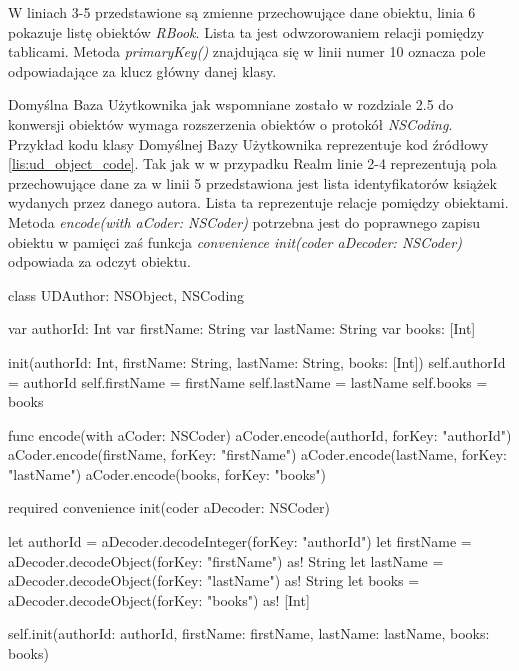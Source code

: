 W liniach 3-5 przedstawione są zmienne przechowujące dane obiektu, linia 6 pokazuje listę obiektów \textit{RBook}. Lista ta jest odwzorowaniem relacji pomiędzy tablicami. Metoda \textit{primaryKey()} znajdująca się w linii numer 10 oznacza pole odpowiadające za klucz główny danej klasy. 

Domyślna Baza Użytkownika jak wspomniane zostało w rozdziale 2.5 do konwersji obiektów wymaga rozszerzenia obiektów o protokół \textit{NSCoding}. Przykład kodu klasy Domyślnej Bazy Użytkownika reprezentuje kod źródłowy \ref{lis:ud_object_code}. Tak jak w w przypadku Realm linie 2-4 reprezentują pola przechowujące dane za w linii 5 przedstawiona jest lista identyfikatorów książek wydanych przez danego autora. Lista ta reprezentuje relacje pomiędzy obiektami. Metoda \textit{encode(with aCoder: NSCoder)} potrzebna jest do poprawnego zapisu obiektu w pamięci zaś funkcja \textit{convenience init(coder aDecoder: NSCoder)} odpowiada za odczyt obiektu.

\begin{code}[
		language=swift,
		caption={Przykład obiektu Domyślnej Bazy Użytkownika},
		label={lis:ud_object_code},
	]
class UDAuthor: NSObject, NSCoding {
    var authorId: Int
    var firstName: String
    var lastName: String
    var books: [Int]
    
    init(authorId: Int, firstName: String, lastName: String, books: [Int]) {
        self.authorId = authorId
        self.firstName = firstName
        self.lastName = lastName
        self.books = books
    }
    
    func encode(with aCoder: NSCoder) {
        aCoder.encode(authorId, forKey: "authorId")
        aCoder.encode(firstName, forKey: "firstName")
        aCoder.encode(lastName, forKey: "lastName")
        aCoder.encode(books, forKey: "books")
    }
    
    required convenience init(coder aDecoder: NSCoder) {
        let authorId = aDecoder.decodeInteger(forKey: "authorId")
        let firstName = aDecoder.decodeObject(forKey: "firstName") as! String
        let lastName = aDecoder.decodeObject(forKey: "lastName") as! String
        let books = aDecoder.decodeObject(forKey: "books") as! [Int]
        
        self.init(authorId: authorId, firstName: firstName, lastName: lastName, books: books)
    }
}

\end{code}

